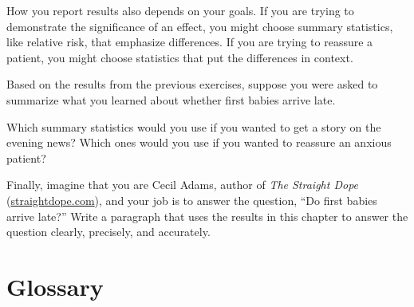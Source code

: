 \documentclass[12pt]{book}
\begin{document}
How you report results also depends on your goals.  If you are
trying to demonstrate the significance of an effect, you might choose
summary statistics, like relative risk, that emphasize differences.
If you are trying to reassure a patient, you might choose statistics
that put the differences in context.

\begin{exercise}
Based on the results from the previous exercises, suppose you were
asked to summarize what you learned about whether first
babies arrive late.

Which summary statistics would you use if you wanted to get a story
on the evening news?  Which ones would you use if you wanted to
reassure an anxious patient?

Finally, imagine that you are Cecil Adams, author of {\it The Straight
  Dope} (\url{straightdope.com}), and your job is to answer the
question, ``Do first babies arrive late?''  Write a paragraph that
uses the results in this chapter to answer the question clearly,
precisely, and accurately.

\end{exercise}



\section{Glossary}
\end{document}
